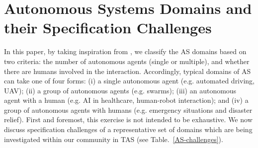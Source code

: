 \documentclass[sigconf,nonacm]{acmart}%
\begin{document}
	\section{Autonomous Systems Domains and their Specification Challenges}\label{as-domains}
In this paper, by taking inspiration from \cite{Schneiders2022}, we classify the AS domains based on two criteria: the number of autonomous agents (single or multiple), and whether there are humans involved in the interaction. Accordingly, typical domains of AS can take one of four forms: (i) a single autonomous agent (e.g. automated driving, UAV); (ii) a group of autonomous agents (e.g. swarms); (iii) an autonomous agent with a human (e.g. AI in healthcare, human-robot interaction); and (iv) a group of autonomous agents with humans (e.g. emergency situations and disaster relief). First and foremost, this exercise is not intended to be exhaustive. We now discuss specification challenges of a representative set of domains which are being investigated within our community in TAS (see Table.~\ref{AS-challenges}). 
\end{document}
